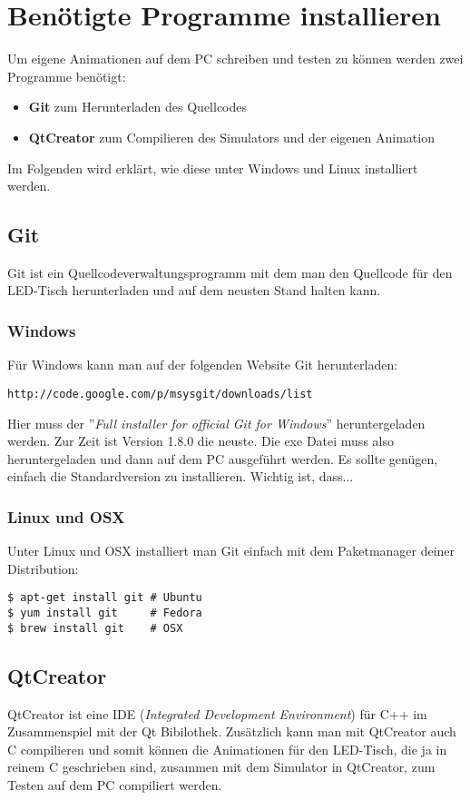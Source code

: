\documentclass[10pt,a4paper]{article}
\begin{document}
\tableofcontents

\section{Benötigte Programme installieren}
Um eigene Animationen auf dem PC schreiben und testen zu können werden zwei Programme benötigt:
\begin{itemize}
	\item \textbf{Git} zum Herunterladen des Quellcodes
	\item \textbf{QtCreator} zum Compilieren des Simulators und der eigenen Animation
\end{itemize}
Im Folgenden wird erklärt, wie diese unter Windows und Linux installiert werden.

\subsection{Git}
Git ist ein Quellcodeverwaltungsprogramm mit dem man den Quellcode für den LED-Tisch herunterladen und auf dem neusten Stand halten kann.

\subsubsection{Windows}
Für Windows kann man auf der folgenden Website Git herunterladen:
\begin{lstlisting}
http://code.google.com/p/msysgit/downloads/list
\end{lstlisting}
Hier muss der ''\textit{Full installer for official Git for Windows}'' heruntergeladen werden. Zur Zeit ist Version 1.8.0 die neuste.
Die exe Datei muss also heruntergeladen und dann auf dem PC ausgeführt werden. Es sollte genügen, einfach die Standardversion zu installieren. Wichtig ist, dass...

\subsubsection{Linux und OSX}
Unter Linux und OSX installiert man Git einfach mit dem Paketmanager deiner Distribution:
\begin{lstlisting}
$ apt-get install git # Ubuntu
$ yum install git     # Fedora
$ brew install git    # OSX
\end{lstlisting}

\subsection{QtCreator}
QtCreator ist eine IDE (\textit{Integrated Development Environment}) für C++ im Zusammenspiel mit der Qt Bibilothek.
Zusätzlich kann man mit QtCreator auch C compilieren und somit können die Animationen für den LED-Tisch, die ja in reinem C geschrieben sind, zusammen mit dem Simulator in QtCreator, zum Testen auf dem PC compiliert werden.
\end{document}
